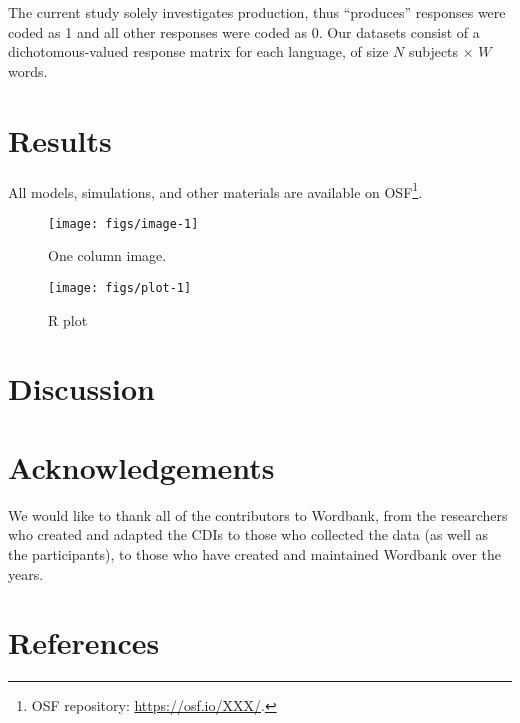 \documentclass[10pt, letterpaper]{article}
\newenvironment{CodeChunk}{}{}
\begin{document}
The current study solely investigates production, thus ``produces''
responses were coded as 1 and all other responses were coded as 0. Our
datasets consist of a dichotomous-valued response matrix for each
language, of size \(N\) subjects \(\times\) \(W\) words.

\hypertarget{results}{%
\section{Results}\label{results}}

All models, simulations, and other materials are available on
OSF\footnote{OSF repository: \url{https://osf.io/XXX/}.}.

\begin{CodeChunk}
\begin{figure}[H]

{\centering \texttt{[image: figs/image-1]} 

}

\caption[One column image]{One column image.}\label{fig:image}
\end{figure}
\end{CodeChunk}

\begin{CodeChunk}
\begin{figure}[H]

{\centering \texttt{[image: figs/plot-1]} 

}

\caption[R plot]{R plot}\label{fig:plot}
\end{figure}
\end{CodeChunk}

\hypertarget{discussion}{%
\section{Discussion}\label{discussion}}

\hypertarget{acknowledgements}{%
\section{Acknowledgements}\label{acknowledgements}}

We would like to thank all of the contributors to Wordbank, from the
researchers who created and adapted the CDIs to those who collected the
data (as well as the participants), to those who have created and
maintained Wordbank over the years.

\hypertarget{references}{%
\section{References}\label{references}}
\end{document}
